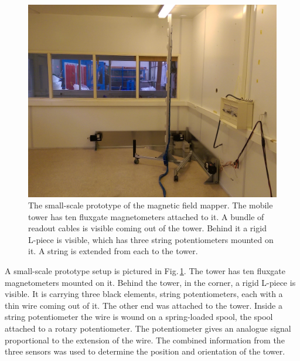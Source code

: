 \begin{figure}
  \centering
  \includegraphics[width=\linewidth]{gfx/mapping/lpsc/setup_crop.jpg}
  \caption{The small-scale prototype of the magnetic field mapper. The mobile tower has ten fluxgate magnetometers attached to it. A bundle of readout cables is visible coming out of the tower. Behind it a rigid L-piece is visible, which has three string potentiometers mounted on it. A string is extended from each to the tower.}\label{fig:mapping_bastille_setup}
\end{figure}

A small-scale prototype setup is pictured in Fig.\,\ref{fig:mapping_bastille_setup}. The tower
has ten fluxgate magnetometers mounted on it. Behind the tower, in the corner, a rigid L-piece is visible. 
It is carrying three black elements, string potentiometers, each with a thin wire coming out of it. The other end was attached to the tower. Inside a string potentiometer the wire is wound on a spring-loaded spool, the spool attached to a rotary potentiometer.
The potentiometer gives an analogue signal proportional to the extension of the wire. The combined information from the three sensors was used to determine the position and orientation of the tower.



